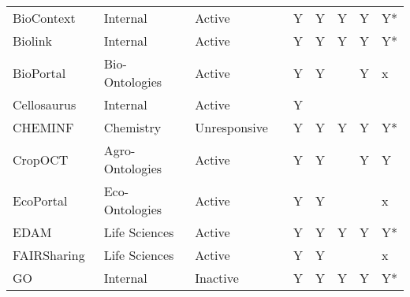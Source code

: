 \begin{table}
\begin{tabular}{lllllllll}
           BioContext~\cite{biocontext} &        Internal &       Active &                           &                      Y &                              Y &                      Y &                    Y &                     Y* \\
                Biolink~\cite{Unni2022} &        Internal &       Active &                           &                      Y &                              Y &                      Y &                    Y &                     Y* \\
           BioPortal~\cite{Whetzel2011} &  Bio-Ontologies &       Active &                           &                      Y &                              Y &                        &                    Y &                      x \\
         Cellosaurus~\cite{Bairoch2018} &        Internal &       Active &                           &                      Y &                                &                        &                      &                        \\
            CHEMINF~\cite{Hastings2011} &       Chemistry & Unresponsive &                           &                      Y &                              Y &                      Y &                    Y &                     Y* \\
              CropOCT~\cite{Arnaud2020} & Agro-Ontologies &       Active &                           &                      Y &                              Y &                        &                    Y &                      Y \\
      EcoPortal~\cite{Kechagioglou2021} &  Eco-Ontologies &       Active &                           &                      Y &                              Y &                        &                      &                      x \\
                   EDAM~\cite{Ison2013} &   Life Sciences &       Active &                           &                      Y &                              Y &                      Y &                    Y &                     Y* \\
         FAIRSharing~\cite{Sansone2019} &   Life Sciences &       Active &                           &                      Y &                              Y &                        &                      &                      x \\
GO~\cite{TheGeneOntologyConsortium2019} &        Internal &     Inactive &                           &                      Y &                              Y &                      Y &                    Y &                     Y* \\

\end{tabular}
\end{table}
